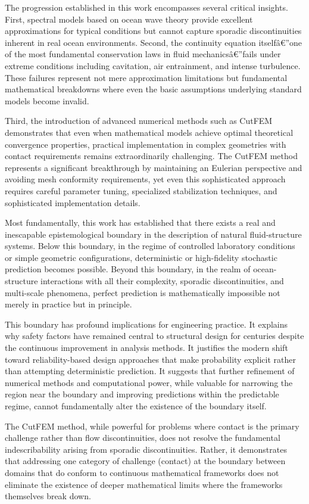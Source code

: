 ﻿\documentclass[a4paper,11pt]{article}
\theoremstyle{definition}
\begin{document}
The progression established in this work encompasses several critical insights. First, spectral models based on ocean wave theory provide excellent approximations for typical conditions but cannot capture sporadic discontinuities inherent in real ocean environments. Second, the continuity equation itselfâ€”one of the most fundamental conservation laws in fluid mechanicsâ€”fails under extreme conditions including cavitation, air entrainment, and intense turbulence. These failures represent not mere approximation limitations but fundamental mathematical breakdowns where even the basic assumptions underlying standard models become invalid.

Third, the introduction of advanced numerical methods such as CutFEM demonstrates that even when mathematical models achieve optimal theoretical convergence properties, practical implementation in complex geometries with contact requirements remains extraordinarily challenging. The CutFEM method represents a significant breakthrough by maintaining an Eulerian perspective and avoiding mesh conformity requirements, yet even this sophisticated approach requires careful parameter tuning, specialized stabilization techniques, and sophisticated implementation details.

Most fundamentally, this work has established that there exists a real and inescapable epistemological boundary in the description of natural fluid-structure systems. Below this boundary, in the regime of controlled laboratory conditions or simple geometric configurations, deterministic or high-fidelity stochastic prediction becomes possible. Beyond this boundary, in the realm of ocean-structure interactions with all their complexity, sporadic discontinuities, and multi-scale phenomena, perfect prediction is mathematically impossible not merely in practice but in principle.

This boundary has profound implications for engineering practice. It explains why safety factors have remained central to structural design for centuries despite the continuous improvement in analysis methods. It justifies the modern shift toward reliability-based design approaches that make probability explicit rather than attempting deterministic prediction. It suggests that further refinement of numerical methods and computational power, while valuable for narrowing the region near the boundary and improving predictions within the predictable regime, cannot fundamentally alter the existence of the boundary itself.

The CutFEM method, while powerful for problems where contact is the primary challenge rather than flow discontinuities, does not resolve the fundamental indescribability arising from sporadic discontinuities. Rather, it demonstrates that addressing one category of challenge (contact) at the boundary between domains that do conform to continuous mathematical frameworks does not eliminate the existence of deeper mathematical limits where the frameworks themselves break down.
\end{document}
